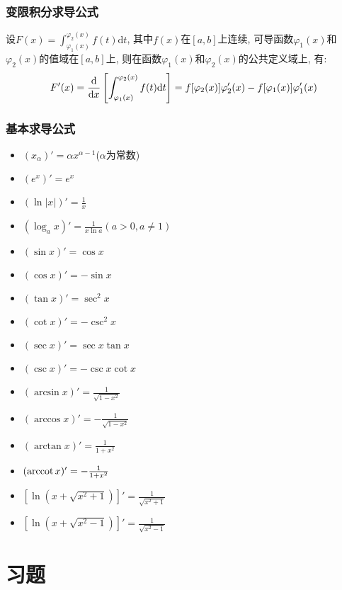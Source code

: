 \subsubsection{变限积分求导公式}
设$ F(x)=\int_{\varphi_{1}(x)}^{\varphi_{2}(x)}f(t)\mathrm{d}t $, 其中$ f(x) $在$ [a,b] $上连续, 可导函数$ \varphi_{1}(x) $和$ \varphi_{2}(x) $的值域在$ [a,b] $上, 则在函数$ \varphi_{1}(x) $和$ \varphi_{2}(x) $的公共定义域上, 有:
\begin{equation*}
F'(x)=\dv{}{x}\left[\int_{\varphi_{1}(x)}^{\varphi_{2}(x)}f(t)\mathrm{d}t\right]=f[\varphi_{2}(x)]\varphi'_{2}(x)-f[\varphi_{1}(x)]\varphi'_{1}(x)
\end{equation*}
\subsubsection{基本求导公式}
\begin{multicols}{2}
\begin{itemize}
\item $ (x_{\alpha})'=\alpha x^{\alpha-1} $($ \alpha $为常数)
\item $ (e^{x})'=e^{x} $
\item $ (\ln |x|)'=\frac{1}{x} $
\item $ (\log_{a}x)'=\frac{1}{x\ln a}(a>0,a\neq 1) $
\item $ (\sin x)'=\cos x $
\item $ (\cos x)'=-\sin x $
\item $ (\tan x)'=\sec^{2}x $
\item $ (\cot x)'=-\csc^{2}x $
\item $ (\sec x)'=\sec x\tan x $
\item $ (\csc x)'=-\csc x\cot x $
\item $ (\arcsin x)'=\frac{1}{\sqrt{1-x^{2}}} $
\item $ (\arccos x)'=-\frac{1}{\sqrt{1-x^{2}}} $
\item $ (\arctan x)'=\frac{1}{1+x^{2}} $
\item $ (\operatorname{arccot} x)'=-\frac{1}{1+x^{2}} $
\item $ [\ln(x+\sqrt{x^{2}+1})]'=\frac{1}{\sqrt{x^{2}+1}} $
\item $ [\ln (x+\sqrt{x^{2}-1})]'=\frac{1}{\sqrt{x^{2}-1}} $
\end{itemize}
\end{multicols}
\section{习题}
